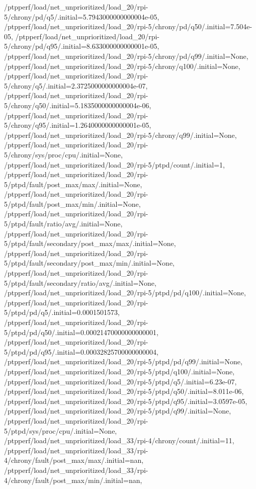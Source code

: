 {    /ptpperf/load/net_unprioritized/load_20/rpi-5/chrony/pd/q5/.initial=5.7943000000000004e-05,
    /ptpperf/load/net_unprioritized/load_20/rpi-5/chrony/pd/q50/.initial=7.504e-05,
    /ptpperf/load/net_unprioritized/load_20/rpi-5/chrony/pd/q95/.initial=8.633000000000001e-05,
    /ptpperf/load/net_unprioritized/load_20/rpi-5/chrony/pd/q99/.initial=None,
    /ptpperf/load/net_unprioritized/load_20/rpi-5/chrony/q100/.initial=None,
    /ptpperf/load/net_unprioritized/load_20/rpi-5/chrony/q5/.initial=2.3725000000000004e-07,
    /ptpperf/load/net_unprioritized/load_20/rpi-5/chrony/q50/.initial=5.1835000000000004e-06,
    /ptpperf/load/net_unprioritized/load_20/rpi-5/chrony/q95/.initial=1.2640000000000001e-05,
    /ptpperf/load/net_unprioritized/load_20/rpi-5/chrony/q99/.initial=None,
    /ptpperf/load/net_unprioritized/load_20/rpi-5/chrony/sys/proc/cpu/.initial=None,
    /ptpperf/load/net_unprioritized/load_20/rpi-5/ptpd/count/.initial=1,
    /ptpperf/load/net_unprioritized/load_20/rpi-5/ptpd/fault/post_max/max/.initial=None,
    /ptpperf/load/net_unprioritized/load_20/rpi-5/ptpd/fault/post_max/min/.initial=None,
    /ptpperf/load/net_unprioritized/load_20/rpi-5/ptpd/fault/ratio/avg/.initial=None,
    /ptpperf/load/net_unprioritized/load_20/rpi-5/ptpd/fault/secondary/post_max/max/.initial=None,
    /ptpperf/load/net_unprioritized/load_20/rpi-5/ptpd/fault/secondary/post_max/min/.initial=None,
    /ptpperf/load/net_unprioritized/load_20/rpi-5/ptpd/fault/secondary/ratio/avg/.initial=None,
    /ptpperf/load/net_unprioritized/load_20/rpi-5/ptpd/pd/q100/.initial=None,
    /ptpperf/load/net_unprioritized/load_20/rpi-5/ptpd/pd/q5/.initial=0.0001501573,
    /ptpperf/load/net_unprioritized/load_20/rpi-5/ptpd/pd/q50/.initial=0.00021470000000000001,
    /ptpperf/load/net_unprioritized/load_20/rpi-5/ptpd/pd/q95/.initial=0.00032825700000000004,
    /ptpperf/load/net_unprioritized/load_20/rpi-5/ptpd/pd/q99/.initial=None,
    /ptpperf/load/net_unprioritized/load_20/rpi-5/ptpd/q100/.initial=None,
    /ptpperf/load/net_unprioritized/load_20/rpi-5/ptpd/q5/.initial=6.23e-07,
    /ptpperf/load/net_unprioritized/load_20/rpi-5/ptpd/q50/.initial=8.011e-06,
    /ptpperf/load/net_unprioritized/load_20/rpi-5/ptpd/q95/.initial=3.0597e-05,
    /ptpperf/load/net_unprioritized/load_20/rpi-5/ptpd/q99/.initial=None,
    /ptpperf/load/net_unprioritized/load_20/rpi-5/ptpd/sys/proc/cpu/.initial=None,
    /ptpperf/load/net_unprioritized/load_33/rpi-4/chrony/count/.initial=11,
    /ptpperf/load/net_unprioritized/load_33/rpi-4/chrony/fault/post_max/max/.initial=nan,
    /ptpperf/load/net_unprioritized/load_33/rpi-4/chrony/fault/post_max/min/.initial=nan,
}
